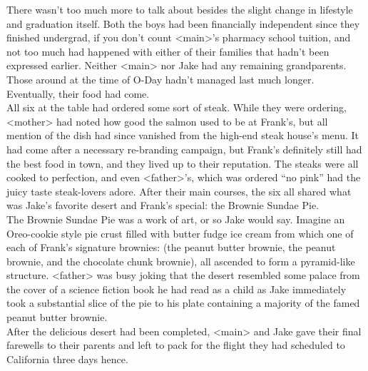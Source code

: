 \documentclass[12pt,openany]{memoir}
\begin{document}
There wasn't too much more to talk about besides the slight change in lifestyle and graduation itself.
Both the boys had been financially independent since they finished undergrad, if you don't count <main>'s pharmacy school tuition, and not too much had happened with either of their families that hadn't been expressed earlier.
Neither <main> nor Jake had any remaining grandparents.
Those around at the time of O-Day hadn't managed last much longer.
Eventually, their food had come.
\\

All six at the table had ordered some sort of steak.
While they were ordering, <mother> had noted how good the salmon used to be at Frank's, but all mention of the dish had since vanished from the high-end steak house's menu.
It had come after a necessary re-branding campaign, but Frank's definitely still had the best food in town, and they lived up to their reputation.
The steaks were all cooked to perfection, and even <father>'s, which was ordered ``no pink'' had the juicy taste steak-lovers adore.
After their main courses, the six all shared what was Jake's favorite desert and Frank's special: the Brownie Sundae Pie.
\\

The Brownie Sundae Pie was a work of art, or so Jake would say.
Imagine an Oreo-cookie style pie crust filled with butter fudge ice cream from which one of each of Frank's signature brownies: (the peanut butter brownie, the peanut brownie, and the chocolate chunk brownie), all ascended to form a pyramid-like structure.
<father> was busy joking that the desert resembled some palace from the cover of a science fiction book he had read as a child as Jake immediately took a substantial slice of the pie to his plate containing a majority of the famed peanut butter brownie.
\\

After the delicious desert had been completed, <main> and Jake gave their final farewells to their parents and left to pack for the flight they had scheduled to California three days hence.
\\

\chapter{}
\end{document}
